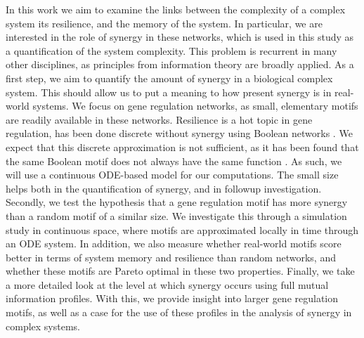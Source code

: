 \documentclass[../main.tex]{subfiles}
\begin{document}
In this work we aim to examine the links between the complexity of a complex system its resilience, and the memory of the system.
In particular, we are interested in the role of synergy in these networks, which is used in this study as a quantification of the system complexity.
This problem is recurrent in many other disciplines, as principles from information theory are broadly applied.
As a first step, we aim to quantify the amount of synergy in a biological complex system.
This should allow us to put a meaning to how present synergy is in real-world systems.
We focus on gene regulation networks, as small, elementary motifs are readily available in these networks.
Resilience is a hot topic in gene regulation, has been done discrete without synergy using Boolean networks \cite{peixoto2012emergence}.
We expect that this discrete approximation is not sufficient, as it has been found that the same Boolean motif does not always have the same function \cite{ingram2006network}.
As such, we will use a continuous ODE-based model for our computations.
The small size helps both in the quantification of synergy, and in followup investigation.
Secondly, we test the hypothesis that a gene regulation motif has more synergy than a random motif of a similar size. 
We investigate this through a simulation study in continuous space, where motifs are approximated locally in time through an ODE system.
In addition, we also measure whether real-world motifs score better in terms of system memory and resilience than random networks, and whether these motifs are Pareto optimal in these two properties.
Finally, we take a more detailed look at the level at which synergy occurs using full mutual information profiles.
With this, we provide insight into larger gene regulation motifs, as well as a case for the use of these profiles in the analysis of synergy in complex systems.
\end{document}
